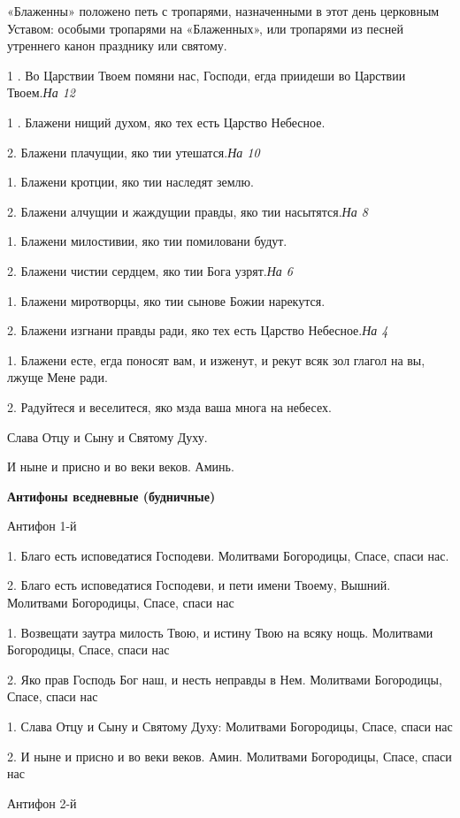 «Блаженны» положено петь с тропарями, назначенными в этот день церковным Уставом: особыми тропарями на «Блаженных», или тропарями из песней утреннего канон празднику или святому.


1 . Во Царствии Твоем помяни нас, Господи, егда приидеши во Царствии Твоем.\itshape  На \normalfont{}12 


1 . Блажени нищий духом, яко тех есть Царство Небесное. 


2. Блажени плачущии, яко тии утешатся.\itshape  На \normalfont{}10 


1. Блажени кротции, яко тии наследят землю. 


2. Блажени алчущии и жаждущии правды, яко тии насытятся.\itshape  На\normalfont{} 8 


1. Блажени милостивии, яко тии помиловани будут. 


2. Блажени чистии сердцем, яко тии Бога узрят.\itshape  На\normalfont{} 6 


1. Блажени миротворцы, яко тии сынове Божии нарекутся. 


2. Блажени изгнани правды ради, яко тех есть Царство Небесное.\itshape  На\normalfont{} 4 


1. Блажени есте, егда поносят вам, и изженут, и рекут всяк зол глагол на вы, лжуще Мене ради. 


2. Радуйтеся и веселитеся, яко мзда ваша многа на небесех. 


Слава Отцу и Сыну и Святому Духу. 


И ныне и присно и во веки веков. Аминь. 


\medskip\bfseries Антифоны вседневные (будничные) \normalfont{}\nopagebreak


Антифон 1-й 


1. Благо есть исповедатися Господеви. Молитвами Богородицы, Спасе, спаси нас. 


2. Благо есть исповедатися Господеви, и пети имени Твоему, Вышний. Молитвами Богородицы, Спасе, спаси нас 


1. Возвещати заутра милость Твою, и истину Твою на всяку нощь. Молитвами Богородицы, Спасе, спаси нас 


2. Яко прав Господь Бог наш, и несть неправды в Нем. Молитвами Богородицы, Спасе, спаси нас


1. Слава Отцу и Сыну и Святому Духу: Молитвами Богородицы, Спасе, спаси нас 


2. И ныне и присно и во веки веков. Амин. Молитвами Богородицы, Спасе, спаси нас

Антифон 2-й 


